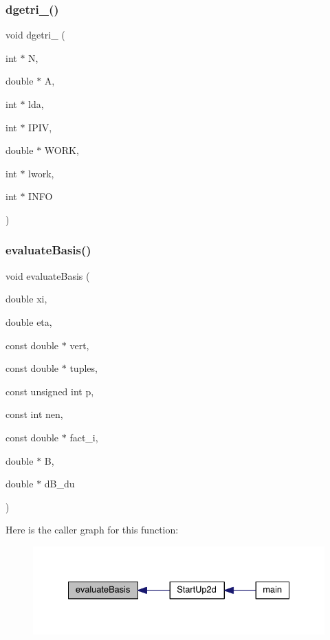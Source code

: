 \subsubsection{\texorpdfstring{dgetri\+\_\+()}{dgetri\_()}}
{\footnotesize\ttfamily void dgetri\+\_\+ (\begin{DoxyParamCaption}\item[{int $\ast$}]{N,  }\item[{double $\ast$}]{A,  }\item[{int $\ast$}]{lda,  }\item[{int $\ast$}]{I\+P\+IV,  }\item[{double $\ast$}]{W\+O\+RK,  }\item[{int $\ast$}]{lwork,  }\item[{int $\ast$}]{I\+N\+FO }\end{DoxyParamCaption})}

\mbox{\label{a00554_a2aba2292a481f3bb8f85213baf22686b}} 
\subsubsection{\texorpdfstring{evaluate\+Basis()}{evaluateBasis()}}
{\footnotesize\ttfamily void evaluate\+Basis (\begin{DoxyParamCaption}\item[{double}]{xi,  }\item[{double}]{eta,  }\item[{const double $\ast$}]{vert,  }\item[{const double $\ast$}]{tuples,  }\item[{const unsigned int}]{p,  }\item[{const int}]{nen,  }\item[{const double $\ast$}]{fact\+\_\+i,  }\item[{double $\ast$}]{B,  }\item[{double $\ast$}]{d\+B\+\_\+du }\end{DoxyParamCaption})}

Here is the caller graph for this function\+:\nopagebreak
\begin{figure}[H]
\begin{center}
\leavevmode
\includegraphics[width=332pt]{a00554_a2aba2292a481f3bb8f85213baf22686b_icgraph}
\end{center}
\end{figure}
\mbox{\label{a00554_a73ad96b82acf2bf80fd24823a58b3f14}} 
